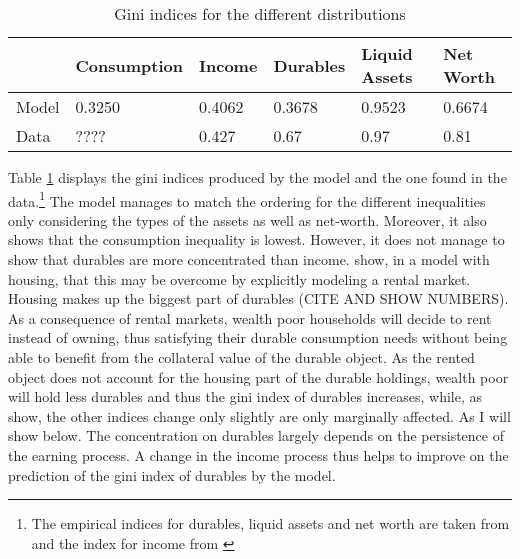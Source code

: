 \documentclass[a4paper,12pt]{article}
\begin{document}
\begin{table}[]
\centering
\caption{Gini indices for the different distributions}
\label{Gini_Ranking}
\begin{tabular}{@{}llllll@{}}
\toprule
      & Consumption & Income & Durables & Liquid Assets & Net Worth \\ \midrule
Model & 0.3250      & 0.4062 & 0.3678   & 0.9523        & 0.6674    \\ \midrule
Data  & ????        & 0.427  & 0.67     & 0.97          & 0.81      \\ \bottomrule
\end{tabular}
\end{table}

Table \ref{Gini_Ranking} displays the gini indices produced by the model and the one found in the data.\footnote{The empirical indices for durables, liquid assets and net worth are taken from \cite{hintermaier2010} and the index for income from \cite{hintermaier2011}} The model manages to match the ordering for the different inequalities only considering the types of the assets as well as net-worth. Moreover, it also shows that the consumption inequality is lowest. However, it does not manage to show that durables are more concentrated than income. \cite{diaz2010} show, in a model with housing, that this may be overcome by explicitly modeling a rental market. Housing makes up the biggest part of durables (CITE AND SHOW NUMBERS). As a consequence of rental markets, wealth poor households will decide to rent instead of owning, thus satisfying their durable consumption needs without being able to benefit from the collateral value of the durable object. As the rented object does not account for the housing part of the durable holdings, wealth poor will hold less durables and thus the gini index of durables increases, while, as \cite{diaz2010} show, the other indices change only slightly are only marginally affected. 
As I will show below. The concentration on durables largely depends on the persistence of the earning process. A change in the income process thus helps to improve on the prediction of the gini index of durables by the model. 
\end{document}

